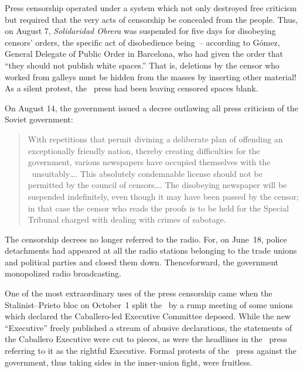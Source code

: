 \begin{sloppypar}
Press censorship operated under a system which not only destroyed free criticism but required that the very acts of censorship be concealed from the people. Thus, on August 7, \emph{Solidaridad Obrera} was suspended for five days for disobeying censors’ orders, the specific act of disobedience being~-- according to G\'omez, General Delegate of Public Order in Barcelona, who had given the order that ``they should not publish white spaces.\kn\kn'' That is, deletions by the censor who worked from galleys must be hidden from the masses by inserting other material! As a silent protest, the \CNT\ press had been leaving censored spaces blank.
\end{sloppypar}

\medskip

On August 14, the government issued a decree outlawing all press criticism of the Soviet government:

\begin{quotation}
  With repetitions that permit divining a deliberate plan of offending an exceptionally friendly nation, thereby creating difficulties for the government, various newspapers have occupied themselves with the \USSR\ unsuitably\dots.
  This absolutely condemnable license should not be permitted by the council of censors\dots. The disobeying newspaper will be suspended indefinitely, even though it may have been passed by the censor; in that case the censor who reads the proofs is to be held for the Special Tribunal charged with dealing with crimes of sabotage.
\end{quotation}

The censorship decrees no longer referred to the radio. For, on June~18, police detachments had appeared at all the radio stations belonging to the trade unions and political parties and closed them down. Thenceforward, the government monopolized radio broadcasting.

One of the most extraordinary uses of the press censorship came when the Stalinist--Prieto bloc on October~1 split the \UGT\ by a rump meeting of some unions which declared the Caballero-led Executive Committee deposed. While the new ``Executive'' freely published a stream of abusive declarations, the statements of the Caballero Executive were cut to pieces, as were the headlines in the \CNT\ press referring to it as the rightful Executive. Formal protests of the \CNT\ press against the government, thus taking sides in the inner-union fight, were fruitless.

